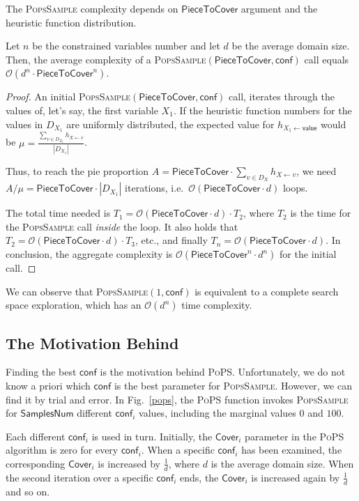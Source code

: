\documentclass{ws-ijait}
\begin{document}
The \textsc{PopsSample} complexity depends on $\mathsf{PieceToCover}$ argument and the heuristic function distribution.
\begin{lemma}
Let $n$ be the constrained variables number and let $d$ be the average domain size. Then, the average complexity of a \textsc{PopsSample}$(\mathsf{PieceToCover},\mathsf{conf})$ call equals $\mathcal{O}(d^n \cdot \mathsf{PieceToCover}^n)$.
\end{lemma}
\begin{proof}
An initial \textsc{PopsSample}$(\mathsf{PieceToCover},\mathsf{conf})$ call, iterates through the values of, let's say, the first variable $X_1$. If the heuristic function numbers for the values in $D_{X_1}$ are uniformly distributed, the expected value for $h_{X_1 \gets \mathsf{value}}$ would be $\mu = \frac{\sum_{v \in D_{X_1}} h_{X \gets v}}{|D_{X_1}|}$.

Thus, to reach the pie proportion $A = \mathsf{PieceToCover} \cdot \sum_{v \in D_X} h_{X \gets v}$, we need $A / \mu = \mathsf{PieceToCover} \cdot |D_{X_1}|$ iterations, i.e.\ $\mathcal{O}(\mathsf{PieceToCover} \cdot d)$ loops.

The total time needed is $T_1 = \mathcal{O}(\mathsf{PieceToCover} \cdot d) \cdot T_2$, where $T_2$ is the time for the \textsc{PopsSample} call \emph{inside} the loop. It also holds that $T_2 = \mathcal{O}(\mathsf{PieceToCover} \cdot d) \cdot T_3$, etc., and finally $T_n = \mathcal{O}(\mathsf{PieceToCover} \cdot d)$. In conclusion, the aggregate complexity is $\mathcal{O}(\mathsf{PieceToCover}^n \cdot d^n)$ for the initial call.
\end{proof}
We can observe that \textsc{PopsSample}$(1,\mathsf{conf})$ is equivalent to a complete search space exploration, which has an $\mathcal{O}(d^n)$ time complexity.


\subsection{The Motivation Behind \PoPS\label{sampling}}

Finding the best $\mathsf{conf}$ is the motivation behind \textsc{PoPS}. Unfortunately, we do not know a priori which $\mathsf{conf}$ is the best parameter for \textsc{PopsSample}. However, we can find it by trial and error. In Fig.~\ref{pops}, the \textsc{PoPS} function invokes \textsc{PopsSample} for $\mathsf{SamplesNum}$ different $\mathsf{conf}_i$ values, including the marginal values $0$ and $100$.

Each different $\mathsf{conf}_i$ is used in turn. Initially, the $\mathsf{Cover}_i$ parameter in the \textsc{PoPS} algorithm is zero for every $\mathsf{conf}_i$. When a specific $\mathsf{conf}_i$ has been examined, the corresponding $\mathsf{Cover}_i$ is increased by $\frac{1}{d}$, where $d$ is the average domain size. When the second iteration over a specific $\mathsf{conf}_i$ ends, the $\mathsf{Cover}_i$ is increased again by $\frac{1}{d}$ and so on.
\end{document}
